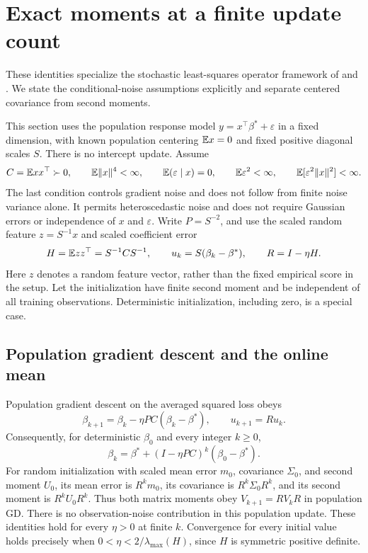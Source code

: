 \section{Exact moments at a finite update count}
\label{sec:discrete}

These identities specialize the stochastic least-squares operator framework of
\citet[Section~2.1]{defossez2015averaged} and
\citet[Appendix~A.4]{jain2018parallelizing}. We state the conditional-noise
assumptions explicitly and separate centered covariance from second moments.

This section uses the population response model
$y = x^\top\beta^* + \varepsilon$ in a fixed dimension, with known population
centering $\mathbb{E} x = 0$ and fixed positive diagonal scales $S$. There is no
intercept update. Assume
\[
 C = \mathbb{E} xx^\top
   \succ 0,\qquad \mathbb{E}\|x\|^4
   < \infty,\qquad \mathbb{E}(\varepsilon \mid x)
   = 0,\qquad \mathbb{E}\varepsilon^2
   < \infty,\qquad \mathbb{E}[\varepsilon^2\|x\|^2]
   < \infty.
\]
The last condition controls gradient noise and does not follow from finite noise
variance alone. It permits heteroscedastic noise and does not require Gaussian
errors or independence of $x$ and $\varepsilon$. Write $P = S^{-2}$, and use the
scaled random feature $z = S^{-1}x$ and scaled coefficient error
\[
 H = \mathbb{E} zz^\top
   = S^{-1}CS^{-1},\qquad u_k
   = S(\beta_k - \beta^*),\qquad R
   = I - \eta H.
\]
Here $z$ denotes a random feature vector, rather than the fixed empirical score
in the setup. Let the initialization have finite second moment and be
independent of all training observations. Deterministic initialization,
including zero, is a special case.

\subsection{Population gradient descent and the online mean}

Population gradient descent on the averaged squared loss obeys
\[
 \beta_{k+1} = \beta_k - \eta PC(\beta_k - \beta^*),\qquad u_{k+1} = Ru_k.
\]
Consequently, for deterministic $\beta_0$ and every integer $k \ge 0$,
\begin{equation}
 \label{eq:discrete-gd}
 \beta_k = \beta^* + (I - \eta PC)^k(\beta_0 - \beta^*).
\end{equation}
For random initialization with scaled mean error $m_0$, covariance $\Sigma_0$,
and second moment $U_0$, its mean error is $R^km_0$, its covariance is
$R^k\Sigma_0R^k$, and its second moment is $R^kU_0R^k$. Thus both matrix moments
obey $V_{k+1} = RV_kR$ in population GD. There is no observation-noise
contribution in this population update. These identities hold for every
$\eta > 0$ at finite $k$. Convergence for every initial value holds precisely
when $0 < \eta < 2/\lambda_{\max}(H)$, since $H$ is symmetric positive definite.

